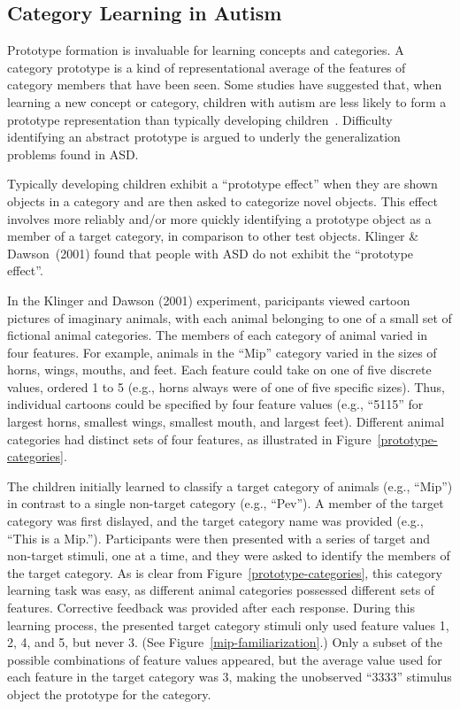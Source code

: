 %
%

\subsection{Category Learning in Autism}
Prototype formation is invaluable for learning concepts and categories. A category prototype is a kind of representational average of the features of category members that have been seen. Some studies have suggested that, when learning a new concept or category, children with autism are less likely to form a prototype representation than typically developing children~\cite{KlingerLG:2001:Prototype,GastgebHZ:2009:Prototype}. Difficulty identifying an abstract prototype is argued to underly the generalization problems found in ASD.

Typically developing children exhibit a ``prototype effect'' when they are shown objects in a category and are then asked to categorize novel objects. This effect involves more reliably and/or more quickly identifying a prototype object as a member of a target category, in comparison to other test objects. Klinger \& Dawson~(2001) \nocite{KlingerLG:2001:Prototype} found that people with ASD do not exhibit the ``prototype effect''.

In the Klinger and Dawson (2001) experiment, paricipants viewed cartoon pictures of imaginary animals, with each animal belonging to one of a small set of fictional animal categories. The members of each category of animal varied in four features. For example, animals in the ``Mip'' category varied in the sizes of horns, wings, mouths, and feet. Each feature could take on one of five discrete values, ordered 1 to 5 (e.g., horns always were of one of five specific sizes). Thus, individual cartoons could be specified by four feature values (e.g., ``5115'' for largest horns, smallest wings, smallest mouth, and largest feet). Different animal categories had distinct sets of four features, as illustrated in Figure~\ref{prototype-categories}.

The children initially learned to classify a target category of animals (e.g., ``Mip'') in contrast to a single non-target category (e.g., ``Pev''). A member of the target category was first dislayed, and the target category name was provided (e.g., ``This is a Mip.''). Participants were then presented with a series of target and non-target stimuli, one at a time, and they were asked to identify the members of the target category. As is clear from Figure~\ref{prototype-categories}, this category learning task was easy, as different animal categories possessed different sets of features. Corrective feedback was provided after each response. During this learning process, the presented target category stimuli only used feature values 1, 2, 4, and 5, but never 3. (See Figure~\ref{mip-familiarization}.) Only a subset of the possible combinations of feature values appeared, but the average value used for each feature in the target category was 3, making the unobserved ``3333'' stimulus object the prototype for the category.


